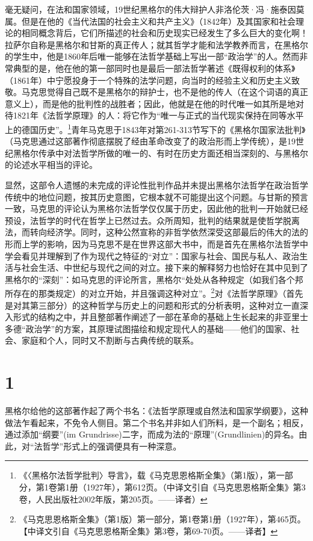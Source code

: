 毫无疑问，在法和国家领域，19世纪黑格尔的伟大辩护人非洛伦茨·冯·施泰因莫属。但是在他的《当代法国的社会主义和共产主义》（1842年）及其国家和社会理论的相同概念背后，它们所描述的社会和历史现实已经发生了多么巨大的变化啊！拉萨尔自称是黑格尔和甘斯的真正传人；就其哲学才能和法学教养而言，在黑格尔的学生中，他是1860年后唯一能够在法哲学基础上写出一部“政治学”的人。然而非常典型的是，他在他的第一部同时也是最后一部法哲学著述《既得权利的体系》（1861年）中宁愿投身于一个特殊的法学问题，向当时的经验主义和历史主义致敬。马克思觉得自己既不是黑格尔的辩护士，也不是他的传人（在这个词语的真正意义上），而是他的批判性的战胜者；因此，他就是在他的时代唯一如其所是地对待1821年《法哲学原理》的人：将它作为“唯一与正式的当代现实保持在同等水平上的德国历史”。\footnote{《〈黑格尔法哲学批判〉导言》，载《马克思恩格斯全集》（第1版），第一部分，第1卷第1册（1927年），第612页。（中译文引自《马克思恩格斯全集》第3卷，人民出版社2002年版，第205页。——译者）}青年马克思于1843年对第261-313节写下的《黑格尔国家法批判》（马克思通过这部著作彻底摆脱了经由革命改变了的政治形而上学传统），是19世纪黑格尔传承中对法哲学所做的唯一的、有时在历史方面还相当深刻的、与黑格尔的论述水平相当的评论。

显然，这部令人遗憾的未完成的评论性批判作品并未提出黑格尔法哲学在政治哲学传统中的地位问题，按其历史意图，它根本就不可能提出这个问题。与甘斯的预言一致，马克思的评论认为黑格尔法哲学仅仅属于历史，因此他的批判一开始就已经预设，法哲学的时代在哲学上已然过去。众所周知，批判的结果就是使哲学脱离法，而转向经济学。同时，这种公然宣称的非哲学依然深受这部最后的伟大的法的形而上学的影响，因为马克思不是在世界这部大书中，而是首先在黑格尔法哲学中学会看见并理解到了作为现代之特征的“对立”：国家与社会、国民与私人、政治生活与社会生活、中世纪与现代之间的对立。接下来的解释努力也恰好在其中见到了黑格尔的“深刻”：如马克思的评论所言，黑格尔“处处从各种规定（如我们各个邦所存在的那类规定）的对立开始，并且强调这种对立”。\footnote{《马克思恩格斯全集》（第1版）第一部分，第1卷第1册（1927年），第465页。【中译文引自《马克思恩格斯全集》第3卷，第69-70页。——译者】}对《法哲学原理》（首先是对其第三部分）的这种哲学与历史上的问题和形式的分析表明，这种对立一直深入形式的结构之中，并且整部著作阐述了一部在革命的基础上生长起来的非亚里士多德“政治学”的方案，其原理试图描绘和规定现代人的基础——他们的国家、社会、家庭和个人，同时又不割断与古典传统的联系。

\section*{1}

黑格尔给他的这部著作起了两个书名：《法哲学原理或自然法和国家学纲要》，这种做法乍看起来，不免令人侧目。第二个书名并非如人们所料，是一个副名；相反，通过添加“纲要”(im Grundrisse)二字，而成为法的“原理”(Grundlinien)的异名。由此，对“法哲学”形式上的强调便具有一种深意。

